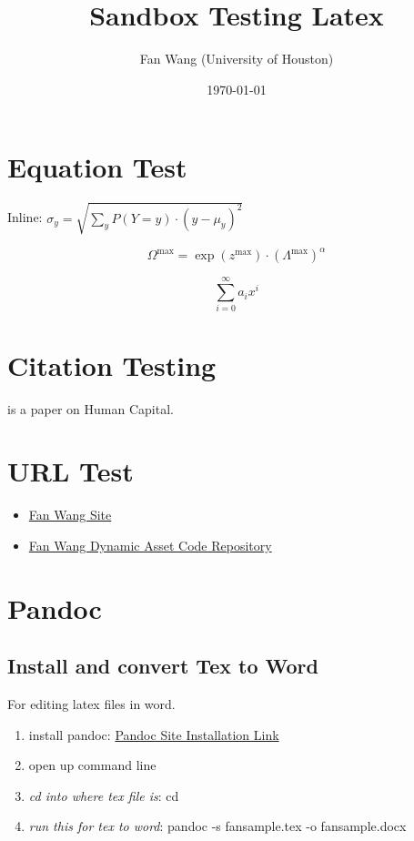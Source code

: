 \documentclass[12pt,english]{article}
\title{Sandbox Testing Latex}
\author{Fan Wang (University of Houston)}
\date{\today}
\begin{document}
\maketitle

\section{Equation Test}

Inline: $\sigma_y = \sqrt{ \sum_{y} P(Y=y) \cdot \left( y - \mu_y \right)^2}$

$$\Omega^{\max} = \exp(z^{\max}) \cdot \left(\Lambda^{\max}\right)^{\alpha}$$

\begin{equation}
\label{eq:1}
\sum_{i=0}^{\infty} a_i x^i
\end{equation}

\section{Citation Testing}

\textcite{becker_human_1986} is a paper on Human Capital.

\section{URL Test}

\begin{itemize}
	\item \href{http://fanwangecon.github.io}{Fan Wang Site}
	\item \href{https://fanwangecon.github.io/CodeDynaAsset/}{Fan Wang Dynamic Asset Code Repository}
\end{itemize}


\pagebreak

\section{Pandoc}

\subsection{Install and convert Tex to Word}

For editing latex files in word.

\begin{enumerate}
	\item install pandoc: \href{https://pandoc.org/installing.html}{Pandoc Site Installation Link}
	\item open up command line
	\item \textit{cd into where tex file is}: cd 
	\item \textit{run this for tex to word}: pandoc -s fansample.tex -o fansample.docx
\end{enumerate}
\end{document}
